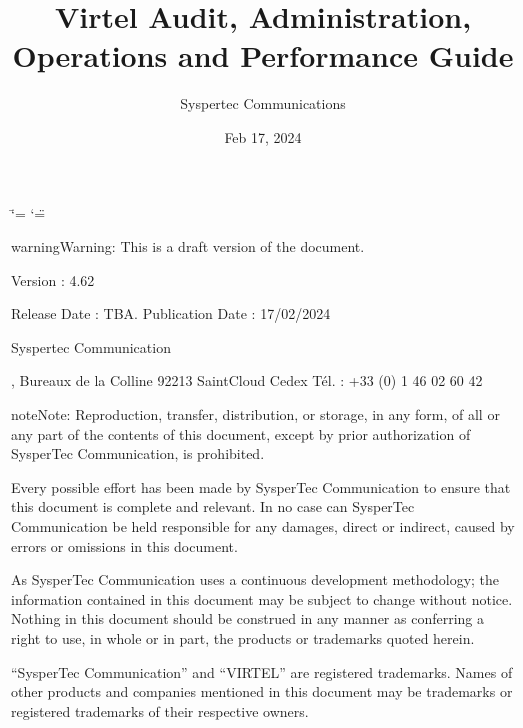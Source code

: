 \documentclass[letterpaper,10pt,english]{sphinxmanual}
\title{Virtel Audit, Administration, Operations and Performance Guide}
\date{Feb 17, 2024}
\author{Syspertec Communications}
\begin{document}
\ifdefined\shorthandoff
  \ifnum\catcode`\=\string=\active\shorthandoff{=}\fi
  \ifnum\catcode`\"=\active{}\fi
\fi

\pagestyle{empty}
\sphinxmaketitle
\pagestyle{plain}
\sphinxtableofcontents
\pagestyle{normal}
\label{\detokenize{audit_operations_ and_performance::doc}}


\sphinxAtStartPar
{}

\sphinxAtStartPar
{}

\begin{sphinxadmonition}{warning}{Warning:}
\sphinxAtStartPar
This is a draft version of the document.
\end{sphinxadmonition}

\sphinxAtStartPar
Version : 4.62

\sphinxAtStartPar
Release Date : TBA. Publication Date : 17/02/2024

\sphinxAtStartPar
Syspertec Communication

, Bureaux de la Colline 92213 Saint\sphinxhyphen{}Cloud Cedex Tél. : +33 (0) 1 46 02 60 42

\sphinxAtStartPar
{}

\begin{sphinxadmonition}{note}{Note:}
\sphinxAtStartPar
Reproduction, transfer, distribution, or storage, in any form, of all or any part of
the contents of this document, except by prior authorization of SysperTec
Communication, is prohibited.

\sphinxAtStartPar
Every possible effort has been made by SysperTec Communication to ensure that this document
is complete and relevant. In no case can SysperTec Communication be held responsible for
any damages, direct or indirect, caused by errors or omissions in this document.

\sphinxAtStartPar
As SysperTec Communication uses a continuous development methodology; the information
contained in this document may be subject to change without notice. Nothing in this
document should be construed in any manner as conferring a right to use, in whole or in
part, the products or trademarks quoted herein.

\sphinxAtStartPar
“SysperTec Communication” and “VIRTEL” are registered trademarks. Names of other products
and companies mentioned in this document may be trademarks or registered trademarks of
their respective owners.
\end{sphinxadmonition}
\end{document}
